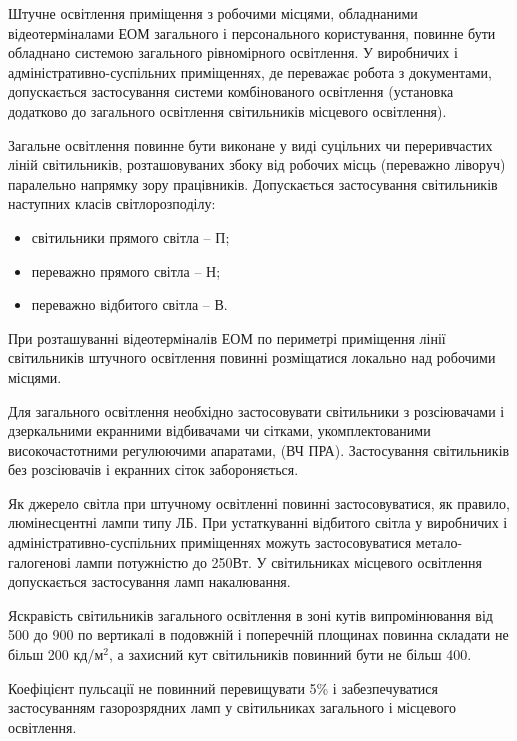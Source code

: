 \documentclass[simple,a4paper,14pt,ukrainian,utf8]{eskdtext}
\begin{document}
\begin{appendices}
                Штучне освітлення приміщення з робочими місцями, обладнаними відеотерміналами ЕОМ загального і персонального користування, повинне бути обладнано системою загального рівномірного освітлення. У виробничих і адміністративно-суспільних приміщеннях, де переважає робота з документами, допускається застосування системи комбінованого освітлення (установка додатково до загального освітлення світильників місцевого освітлення).

                Загальне освітлення повинне бути виконане у виді суцільних чи переривчастих ліній світильників, розташовуваних збоку від робочих місць (переважно ліворуч) паралельно напрямку зору працівників. Допускається застосування світильників наступних класів світлорозподілу:

                \begin{itemize}
                    \item світильники прямого світла -- П;
                    \item переважно прямого світла -- Н;
                    \item переважно відбитого світла -- В.
                \end{itemize}

                При розташуванні відеотерміналів ЕОМ по периметрі приміщення лінії світильників штучного освітлення повинні розміщатися локально над робочими місцями.

                Для загального освітлення необхідно застосовувати світильники з розсіювачами і дзеркальними екранними відбивачами чи сітками, укомплектованими високочастотними регулюючими апаратами, (ВЧ ПРА). Застосування світильників без розсіювачів і екранних сіток забороняється.

                Як джерело світла при штучному освітленні повинні застосовуватися, як правило, люмінесцентні лампи типу ЛБ. При устаткуванні відбитого світла у виробничих і адміністративно-суспільних приміщеннях можуть застосовуватися метало-галогенові лампи потужністю до 250Вт. У світильниках місцевого освітлення допускається застосування ламп накалювання.

                Яскравість світильників загального освітлення в зоні кутів випромінювання від 500 до 900 по вертикалі в подовжній і поперечній площинах повинна складати не більш 200 кд/м$^{2}$, а захисний кут світильників повинний бути не більш 400.

                Коефіцієнт пульсації не повинний перевищувати 5\% і забезпечуватися застосуванням газорозрядних ламп у світильниках загального і місцевого освітлення.


\end{appendices}
\end{document}
